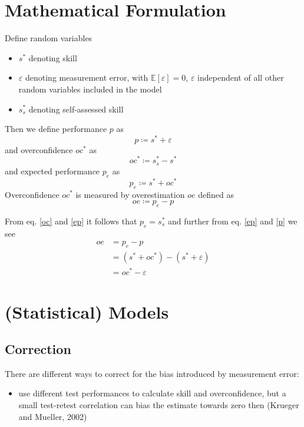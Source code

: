 \documentclass[a4paper,11pt]{article}
\renewcommand*{\epsilon}{\varepsilon}%
\newcommand{\1}{\mathbf{1}}
\newcommand{\Exp}{\mathbb{E}}
\begin{document}
\section{Mathematical Formulation}
Define random variables
\begin{itemize}
 \item $s^*$ denoting skill
 \item $\epsilon$ denoting measurement error, with $\Exp[\epsilon] = 0$, $\epsilon$ independent of all other random variables included in the model
 \item $s^*_s$ denoting self-assessed skill
\end{itemize}

\noindent Then we define performance $p$ as
\begin{equation} \label{p}
  p \coloneq s^* + \epsilon
\end{equation}
and overconfidence $oc^*$ as
\begin{equation} \label{oc}
  oc^* \coloneq s^*_s-s^*
\end{equation}
and expected performance $p_e$ as
\begin{equation} \label{ep}
  p_e \coloneq s^* + oc^*
\end{equation}
Overconfidence $oc^*$ is measured by overestimation $oe$ defined as
\begin{equation}
  oe \coloneq p_e - p
\end{equation}

\noindent From eq. \ref{oc} and \ref{ep} it follows that $p_e = s^*_s$ and further from eq. \ref{ep} and \ref{p} we see
\begin{align}
  oe &= p_e - p \\
  &= (s^* + oc^*) - (s^* + \epsilon) \\
  &= oc^* - \epsilon
\end{align}
\section{(Statistical) Models}


\subsection{Correction}
There are different ways to correct for the bias introduced by measurement error:
\begin{itemize}
 \item use different test performances to calculate skill and overconfidence, but a small test-retest correlation can bias the estimate towards zero then (Krueger and Mueller, 2002)
\end{itemize}
\end{document}
